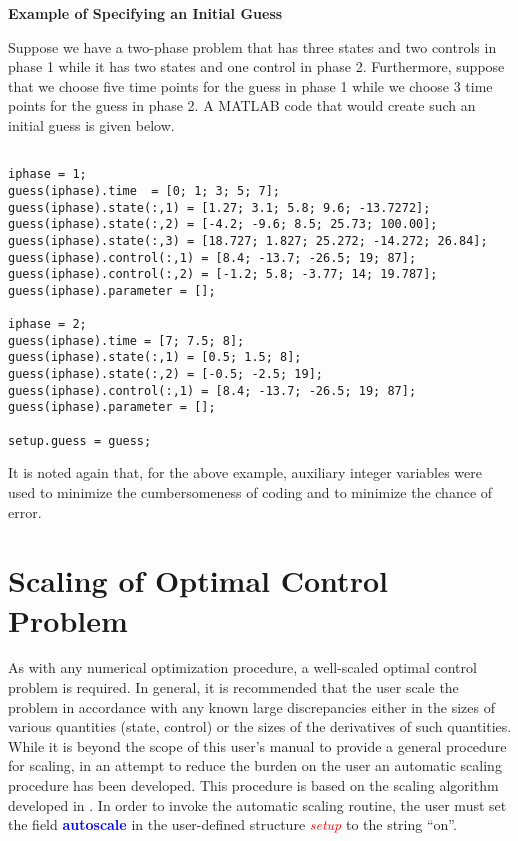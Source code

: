 \documentclass[10pt,final]{report}
\newcounter{example}[chapter]
\newenvironment{shadedframe}{%
  \def\FrameCommand{\fcolorbox{black}{shadecolor}}%
  \MakeFramed {\FrameRestore}}
{\endMakeFramed}
\newcommand{\bfblue}[1]{\textcolor{blue}{\bf #1}}
\newcommand{\slred}[1]{\textcolor{red}{\sl #1}}
\begin{document}
\begin{shadedframe}

{\noindent}{\bf Example of Specifying an Initial Guess}

\vspace{12pt}
Suppose we have a two-phase problem that has three states and two controls in
phase 1 while it has two states and one control in phase 2.  Furthermore,
suppose that we choose five time points for the guess in phase 1 while we
choose 3 time points for the guess in phase 2.  A MATLAB code that would
create such an initial guess is given below.
\begin{verbatim}

iphase = 1;
guess(iphase).time  = [0; 1; 3; 5; 7];
guess(iphase).state(:,1) = [1.27; 3.1; 5.8; 9.6; -13.7272];
guess(iphase).state(:,2) = [-4.2; -9.6; 8.5; 25.73; 100.00];
guess(iphase).state(:,3) = [18.727; 1.827; 25.272; -14.272; 26.84];
guess(iphase).control(:,1) = [8.4; -13.7; -26.5; 19; 87];
guess(iphase).control(:,2) = [-1.2; 5.8; -3.77; 14; 19.787];
guess(iphase).parameter = [];

iphase = 2;
guess(iphase).time = [7; 7.5; 8];
guess(iphase).state(:,1) = [0.5; 1.5; 8];
guess(iphase).state(:,2) = [-0.5; -2.5; 19];
guess(iphase).control(:,1) = [8.4; -13.7; -26.5; 19; 87];
guess(iphase).parameter = [];

setup.guess = guess;

\end{verbatim}
\end{shadedframe}
It is noted again that, for the above example, auxiliary integer
variables were used to minimize the cumbersomeness of coding and to
minimize the chance of error.

\section{Scaling of Optimal Control Problem\label{sect:_scaling}}

As with any numerical optimization procedure, a well-scaled optimal control problem is required.  In general, it is
recommended that the user scale the problem in accordance with any known large
discrepancies either in the sizes of various quantities (\ie state, control)
or the sizes of the derivatives of such quantities.  While it is beyond the
scope of this user's manual to provide a general procedure for scaling, in an
attempt to reduce the burden on the user an automatic scaling procedure has
been developed.  This procedure is based on the scaling
algorithm developed in \cite{Betts1}.  In order to invoke the automatic
scaling routine, the user must set the field \bfblue{autoscale} in the
user-defined structure \slred{setup} to the string ``on''.
\end{document}
